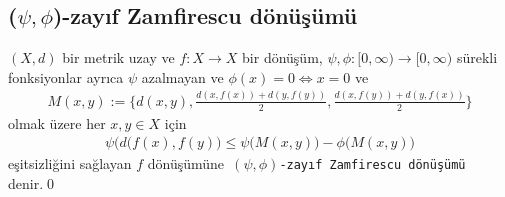\documentclass[8pt]{beamer}
\begin{document}
\subsection{($\psi,\phi$)-zay\i f Zamfirescu d\"{o}n\"{u}\c{s}\"{u}m\"{u}}
\begin{frame}
  \begin{definition}
    $(X,d)$  bir metrik uzay ve $f: X \rightarrow X$ bir d\"{o}n\"{u}\c{s}\"{u}m, $\psi,\phi : [0,\infty)\to [0,\infty)$ s\"urekli fonksiyonlar ayr\i ca $\psi$ azalmayan ve $\phi(x)=0 \iff x=0$ ve
    \begin{align}
M(x,y):=\bigg\{ d(x,y), \frac{d(x,f(x))+d(y,f(y))}{2}, \frac{d(x,f(y))+d(y,f(x))}{2} \bigg\}
    \end{align}
olmak \"{u}zere her $x,y \in X$ i\c{c}in
\begin{align}
\psi\big(d(f(x),f(y)\big)\leq \psi\big(M(x,y)\big)-\phi\big(M(x,y)\big)
\end{align}
e\c{s}itsizli\u{g}ini sa\u{g}layan $f$ d\"{o}n\"{u}\c{s}\"{u}m\"une\texttt{ $(\psi,\phi)$-zay\i f Zamfirescu d\"{o}n\"{u}\c{s}\"{u}m\"{u}} denir.\qed 
  \end{definition}
\end{frame}%
\end{document}

